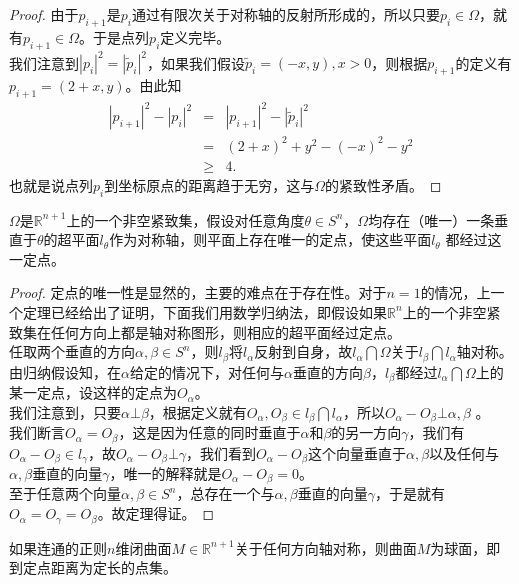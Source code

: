 \begin{enumerate}
\begin{proof}
由于$p_{i+1}$是$p_{i}$通过有限次关于对称轴的反射所形成的，所以只要$p_{i}\in\Omega$，就有$p_{i+1}\in\Omega$。于是点列$p_{i}$定义完毕。\\
我们注意到$|p_{i}|^{2}=|\widetilde{p}_{i}|^{2}$，如果我们假设$\widetilde{p}_{i}=(-x,y),x>0$，则根据$p_{i+1}$的定义有$p_{i+1}=(2+x,y)$。由此知
\begin{eqnarray*}
|p_{i+1}|^{2}-|p_{i}|^{2}&=&|p_{i+1}|^{2}-|\widetilde{p}_{i}|^{2}\\
&=&(2+x)^{2}+y^{2}-(-x)^{2}-y^{2}\\
&\geq& 4.
\end{eqnarray*}
也就是说点列$p_{i}$到坐标原点的距离趋于无穷，这与$\Omega$的紧致性矛盾。
\end{proof}
\begin{theorem}
$\Omega$是$\mathbb{R}^{n+1}$上的一个非空紧致集，假设对任意角度$\theta\in S^{n}$，$\Omega$均存在（唯一）一条垂直于$\theta$的超平面$l_{\theta}$作为对称轴，则平面上存在唯一的定点，使这些平面$l_{\theta}$ 都经过这一定点。
\end{theorem}
\begin{proof}
定点的唯一性是显然的，主要的难点在于存在性。对于$n=1$的情况，上一个定理已经给出了证明，下面我们用数学归纳法，即假设如果$\mathbb{R}^{n}$上的一个非空紧致集在任何方向上都是轴对称图形，则相应的超平面经过定点。\\
任取两个垂直的方向$\alpha, \beta\in S^{n}$，则$l_{\beta}$将$l_{\alpha}$反射到自身，故$l_{\alpha}\bigcap\Omega$关于$l_{\beta}\bigcap l_{\alpha}$轴对称。\\
由归纳假设知，在$\alpha$给定的情况下，对任何与$\alpha$垂直的方向$\beta$，$l_{\beta}$都经过$l_{\alpha}\bigcap\Omega$上的某一定点，设这样的定点为$O_{\alpha}$。\\
我们注意到，只要$\alpha\bot\beta$，根据定义就有$O_{\alpha},O_{\beta}\in l_{\beta}\bigcap l_{\alpha}$，所以$O_{\alpha}-O_{\beta}\bot\alpha,\beta$ 。\\
我们断言$O_{\alpha}=O_{\beta}$，这是因为任意的同时垂直于$\alpha$和$\beta$的另一方向$\gamma$，我们有$O_{\alpha}-O_{\beta}\in l_{\gamma}$，故$O_{\alpha}-O_{\beta}\bot\gamma$，我们看到$O_{\alpha}-O_{\beta}$这个向量垂直于$\alpha,\beta$以及任何与$\alpha,\beta$垂直的向量$\gamma$，唯一的解释就是$O_{\alpha}-O_{\beta}=0$。\\
至于任意两个向量$\alpha, \beta\in S^{n}$，总存在一个与$\alpha,\beta$垂直的向量$\gamma$，于是就有$O_{\alpha}=O_{\gamma}=O_{\beta}$。故定理得证。
\end{proof}
\begin{theorem}
如果连通的正则$n$维闭曲面$M\in\mathbb{R}^{n+1}$关于任何方向轴对称，则曲面$M$为球面，即到定点距离为定长的点集。

\end{theorem}
\end{enumerate}
